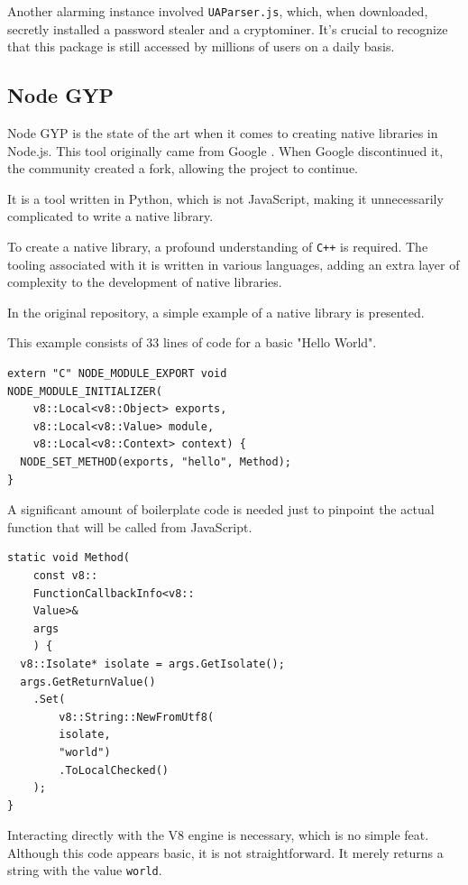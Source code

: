 \documentclass[10pt,journal,compsoc]{IEEEtran}
\begin{document}
Another alarming instance involved \verb|UAParser.js|, which, when downloaded, secretly installed a password stealer and a cryptominer. It's crucial to recognize that this package is still accessed by millions of users on a daily basis.

\subsection{Node GYP}

Node GYP is the state of the art when it comes to creating native libraries in Node.js. This tool originally came from Google \cite{FKNODE}. When Google discontinued it, the community created a fork, allowing the project to continue. \cite{NODEGYP}

It is a tool written in Python, which is not JavaScript, making it unnecessarily complicated to write a native library.

To create a native library, a profound understanding of \verb|C++| is required. The tooling associated with it is written in various languages, adding an extra layer of complexity to the development of native libraries.

In the original repository, a simple example of a native library is presented. \cite{NODEGYP}

This example consists of 33 lines of code for a basic "Hello World".

\begin{lstlisting}
extern "C" NODE_MODULE_EXPORT void
NODE_MODULE_INITIALIZER(
    v8::Local<v8::Object> exports,
    v8::Local<v8::Value> module,
    v8::Local<v8::Context> context) {
  NODE_SET_METHOD(exports, "hello", Method);
}
\end{lstlisting}

A significant amount of boilerplate code is needed just to pinpoint the actual function that will be called from JavaScript.

\begin{lstlisting}
static void Method(
    const v8::
    FunctionCallbackInfo<v8::
    Value>& 
    args
    ) {
  v8::Isolate* isolate = args.GetIsolate();
  args.GetReturnValue()
    .Set(
        v8::String::NewFromUtf8(
        isolate, 
        "world")
        .ToLocalChecked()
    );
}
\end{lstlisting}

Interacting directly with the V8 engine is necessary, which is no simple feat. Although this code appears basic, it is not straightforward. It merely returns a string with the value \verb|world|.
\end{document}
